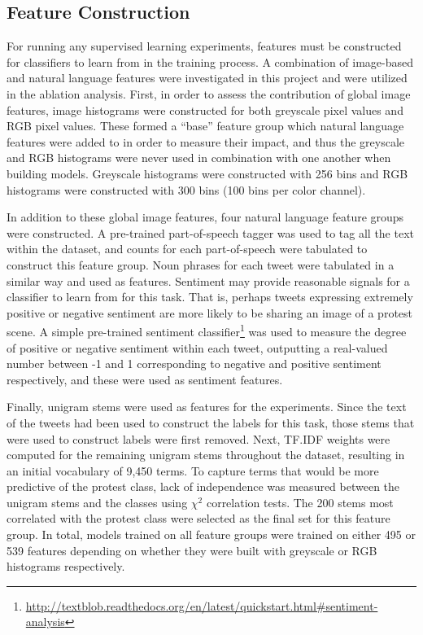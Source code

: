 \documentclass[twoside,11pt]{article}
\begin{document}
\subsection{Feature Construction}
For running any supervised learning experiments, features must be constructed for classifiers to learn from in the training process. A combination of image-based and natural language features were investigated in this project and were utilized in the ablation analysis. First, in order to assess the contribution of global image features, image histograms were constructed for both greyscale pixel values and RGB pixel values. These formed a ``base'' feature group which natural language features were added to in order to measure their impact, and thus the greyscale and RGB histograms were never used in combination with one another when building models. Greyscale histograms were constructed with 256 bins and RGB histograms were constructed with 300 bins (100 bins per color channel).
\par
In addition to these global image features, four natural language feature groups were constructed. A pre-trained part-of-speech tagger was used to tag all the text within the dataset, and counts for each part-of-speech were tabulated to construct this feature group. Noun phrases for each tweet were tabulated in a similar way and used as features. Sentiment may provide reasonable signals for a classifier to learn from for this task. That is, perhaps tweets expressing extremely positive or negative sentiment are more likely to be sharing an image of a protest scene. A simple pre-trained sentiment classifier\footnote{\url{http://textblob.readthedocs.org/en/latest/quickstart.html\#sentiment-analysis}} was used to measure the degree of positive or negative sentiment within each tweet, outputting a real-valued number between -1 and 1 corresponding to negative and positive sentiment respectively, and these were used as sentiment features.
\par
Finally, unigram stems were used as features for the experiments. Since the text of the tweets had been used to construct the labels for this task, those stems that were used to construct labels were first removed. Next, TF.IDF weights were computed for the remaining unigram stems throughout the dataset, resulting in an initial vocabulary of 9,450 terms. To capture terms that would be more predictive of the protest class, lack of independence was measured between the unigram stems and the classes using $\chi^2$ correlation tests. The 200 stems most correlated with the protest class were selected as the final set for this feature group. In total, models trained on all feature groups were trained on either 495 or 539 features depending on whether they were built with greyscale or RGB histograms respectively. 
\end{document}
